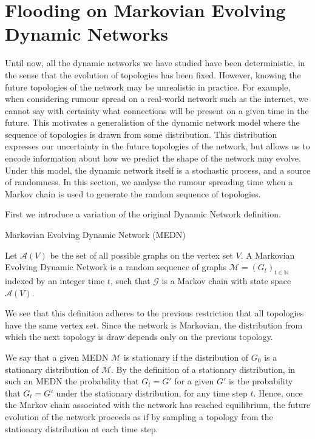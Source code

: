 \section{Flooding on Markovian Evolving Dynamic Networks}\label{section:MEDNBound}

Until now, all the dynamic networks we have studied have been deterministic, in the sense that the evolution of topologies has been fixed. However, knowing the future topologies of the network may be unrealistic in practice. For example, when considering rumour spread on a real-world network such as the internet, we cannot say with certainty what connections will be present on a given time in the future. This motivates a generalistion of the dynamic network model where the sequence of topologies is drawn from some distribution. This distribution expresses our uncertainty in the future topologies of the network, but allows us to encode information about how we predict the shape of the network may evolve. Under this model, the dynamic network itself is a stochastic process, and a source of randomness. In this section, we analyse the rumour spreading time when a Markov chain is used to  generate the random sequence of topologies.

First we introduce a variation of the original Dynamic Network definition.

\begin{definition}
	Markovian Evolving Dynamic Network (MEDN)

	\noindent 
	Let $\mathcal{A}(V)$ be the set of all possible graphs on the vertex set $V$.
	A Markovian Evolving Dynamic Network is a random sequence of graphs $\mathcal{M} = (G_t)_{t \in \mathbb{N}}$ indexed by an integer time $t$, such that $\mathcal{G}$ is a Markov chain with state space $\mathcal{A}(V)$.
\end{definition}

We see that this definition adheres to the previous restriction that all topologies have the same vertex set. Since the network is Markovian, the distribution from which the next topology is draw depends only on the previous topology.

We say that a given MEDN $\mathcal{M}$ is stationary if the distribution of $G_0$ is a stationary distribution of $\mathcal{M}$. By the definition of a stationary distribution, in such an MEDN the probability that $G_t = G'$ for a given $G'$ is the probability that $G_t = G'$ under the stationary distribution, for any time step $t$. Hence, once the Markov chain associated with the network has reached equilibrium,
the future evolution of the network proceeds as if by sampling a topology from the stationary distribution at each time step.

